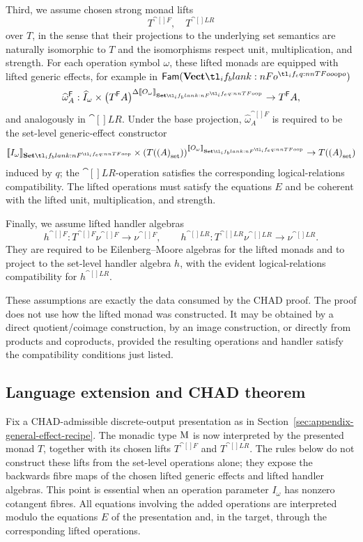 \documentclass[11pt,a4paper]{article}
\theoremstyle{definition}
\theoremstyle{remark}
\providecommand{\Fam}[1]{\mathsf{Fam}(#1)}
\providecommand{\base}[1]{\left(#1\right)_{\mathrm{set}}}
\providecommand{\setint}[1]{\llbracket #1\rrbracket_{\Set}}
\begin{document}
Third, we assume chosen strong monad lifts
\[
  T^{\cat[]{F}},\quad T^{\cat[]{LR}}
\]
over \(T\), in the sense that their projections to the underlying set semantics are naturally isomorphic to \(T\) and the isomorphisms respect unit, multiplication, and strength. For each operation symbol \(\omega\), these lifted monads are equipped with lifted generic effects, for example in \(\Fam{\Vect[o]}\)
\[
  \widehat\omega^{\cat[]{F}}_A:
  \widehat I_{\omega}\times
  \left(T^{\cat[]{F}}A\right)^{\Delta\setint{O_{\omega}}}
  \to
  T^{\cat[]{F}}A,
\]
and analogously in \(\cat[]{LR}\). Under the base projection, \(\widehat\omega^{\cat[]{F}}_A\) is required to be the set-level generic-effect constructor
\[
  \setint{I_{\omega}}\times
  \left(\Fun[np]{T}{\base{A}}\right)^{\setint{O_{\omega}}}
  \to
  \Fun[np]{T}{\base{A}}
\]
induced by \(q\); the \(\cat[]{LR}\)-operation satisfies the corresponding logical-relations compatibility. The lifted operations must satisfy the equations \(E\) and be coherent with the lifted unit, multiplication, and strength.

Finally, we assume lifted handler algebras
\[
  h^{\cat[]{F}}:T^{\cat[]{F}}\nu^{\cat[]{F}}\to \nu^{\cat[]{F}},
  \qquad
  h^{\cat[]{LR}}:T^{\cat[]{LR}}\nu^{\cat[]{LR}}\to \nu^{\cat[]{LR}}.
\]
They are required to be Eilenberg--Moore algebras for the lifted monads and to project to the set-level handler algebra \(h\), with the evident logical-relations compatibility for \(h^{\cat[]{LR}}\).

These assumptions are exactly the data consumed by the CHAD proof. The proof does not use how the lifted monad was constructed. It may be obtained by a direct quotient/coimage construction, by an image construction, or directly from products and coproducts, provided the resulting operations and handler satisfy the compatibility conditions just listed.



\subsection{Language extension and CHAD theorem}
\label{sec:appendix-language-extension-chad-theorem}

Fix a CHAD-admissible discrete-output presentation as in
Section~\ref{sec:appendix-general-effect-recipe}.  The monadic type
\(\opn[b]{M}\) is now interpreted by the presented monad \(T\), together with
its chosen lifts \(T^{\cat[]{F}}\) and \(T^{\cat[]{LR}}\).  The rules below do
not construct these lifts from the set-level operations alone; they expose the
backwards fibre maps of the chosen lifted generic effects and lifted handler
algebras.  This point is essential when an operation parameter
\(I_{\omega}\) has nonzero cotangent fibres.  All equations involving the added
operations are interpreted modulo the equations \(E\) of the presentation and,
in the target, through the corresponding lifted operations.
\end{document}
